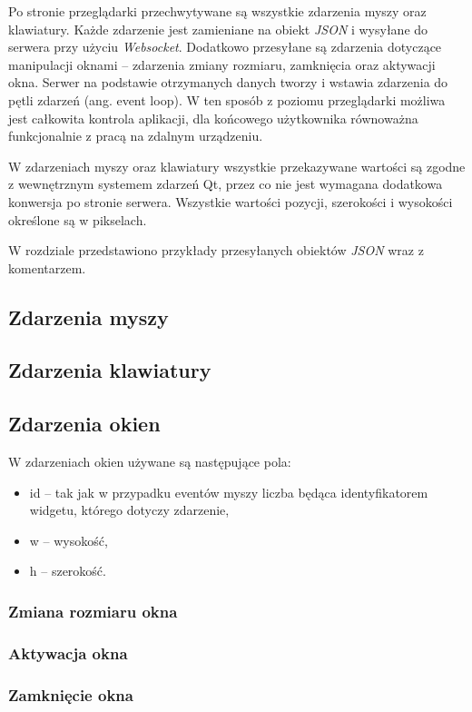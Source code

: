 Po stronie przeglądarki przechwytywane są wszystkie zdarzenia myszy oraz klawiatury. Każde zdarzenie jest zamieniane na obiekt \emph{JSON} i wysyłane do serwera przy użyciu \emph{Websocket}. Dodatkowo przesyłane są zdarzenia dotyczące manipulacji oknami -- zdarzenia zmiany rozmiaru, zamknięcia oraz aktywacji okna. Serwer na podstawie otrzymanych danych tworzy i wstawia zdarzenia do pętli zdarzeń (ang. event loop). W ten sposób z poziomu przeglądarki możliwa jest całkowita kontrola aplikacji, dla końcowego użytkownika równoważna funkcjonalnie z pracą na zdalnym urządzeniu.

W zdarzeniach myszy oraz klawiatury wszystkie przekazywane wartości są zgodne z wewnętrznym systemem zdarzeń Qt, przez co nie jest wymagana dodatkowa konwersja po stronie serwera. Wszystkie wartości pozycji, szerokości i wysokości określone są w pikselach.

W rozdziale przedstawiono przykłady przesyłanych obiektów \emph{JSON} wraz z komentarzem.

\subsection{Zdarzenia myszy}



\subsection{Zdarzenia klawiatury}


\subsection{Zdarzenia okien}

W zdarzeniach okien używane są następujące pola:
\begin{itemize}
\item id -- tak jak w przypadku eventów myszy liczba będąca identyfikatorem widgetu, którego dotyczy zdarzenie,
\item w -- wysokość,
\item h -- szerokość.
\end{itemize}

\subsubsection{Zmiana rozmiaru okna}


\subsubsection{Aktywacja okna}


\subsubsection{Zamknięcie okna}

